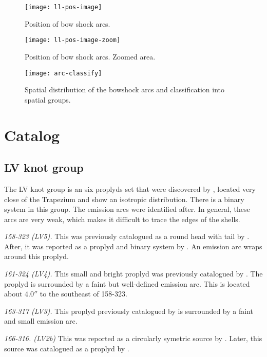 \documentclass[iop, apj]{emulateapj}
\begin{document}
\begin{figure*}
  \texttt{[image: ll-pos-image]}
  \caption{Position of bow shock arcs.}
  \label{fig:pos-image}
\end{figure*}

\begin{figure*}
  \texttt{[image: ll-pos-image-zoom]}
  \caption{Position of bow shock arcs. Zoomed area.}
  \label{fig:pos-image}
\end{figure*}

\begin{figure*}
  \centering
  \texttt{[image: arc-classify]}
  \caption{Spatial distribution of the bowshock arcs and classification into spatial groups.}
  \label{fig:size-v-distance}
\end{figure*}

\section{Catalog}
\label{sec:catalog}

\subsection{LV knot group}
\label{sec:lv-group}



The LV knot group is an six proplyds set that were discovered by \citet{Laques:1979a}, located very close of the Trapezium and show an isotropic distribution. There is  a binary system in this group. The emission arcs were identified after. In general, these arcs are very weak, which makes it difficult to trace the edges of the shells.

\textit{158-323 (LV5).} This was previously catalogued as a round head with tail by \citet{ODell:1996a}. After, it was reported as a proplyd and binary system by \citep{Ricci:2008a}. An emission arc wraps around this proplyd. 
 
\textit{161-324 (LV4).} This small and bright proplyd was previously catalogued by \citet{ODell:1996a, Ricci:2008a}. The proplyd is surrounded by a faint but well-defined emission arc. This is located about \(4.0''\) to the southeast of 158-323.

\textit{163-317 (LV3).} This proplyd previously catalogued by \citet{ODell:1996a, Ricci:2008a} is surrounded by a faint and small emission arc. 

\textit{166-316. (LV2b)} This was reported as a circularly symetric source by \citet{ODell:1996a}. Later, this source was catalogued as a proplyd by \citet{Ricci:2008a}. 
\end{document}
